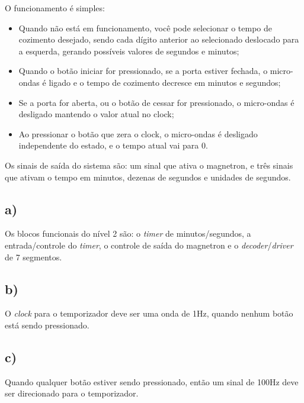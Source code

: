 \documentclass[12pt]{article}
\begin{document}
O funcionamento é simples:

\begin{center}
	\begin{itemize}
		\item Quando não está em funcionamento, você pode selecionar o tempo de cozimento desejado, sendo cada dígito anterior ao selecionado deslocado para a esquerda, gerando possíveis valores de segundos e minutos;
		\item Quando o botão iniciar for pressionado, se a porta estiver fechada, o micro-ondas é ligado e o tempo de cozimento decresce em minutos e segundos;
		\item Se a porta for aberta, ou o botão de cessar for pressionado, o micro-ondas é desligado mantendo o valor atual no clock;
		\item Ao pressionar o botão que zera o clock, o micro-ondas é desligado independente do estado, e o tempo atual vai para 0.
	\end{itemize}
\end{center}

Os sinais de saída do sistema são: um sinal que ativa o magnetron, e três sinais que ativam o tempo em minutos, dezenas de segundos e unidades de segundos.


\subsection*{a)} Os blocos funcionais do nível 2 são: o \textit{timer} de minutos/segundos, a entrada/controle do \textit{timer}, o controle de saída do magnetron e o \textit{decoder}/\textit{driver} de 7 segmentos.

\subsection*{b)} O \textit{clock} para o temporizador deve ser uma onda de 1Hz, quando nenhum botão está sendo pressionado.

\subsection*{c)} Quando qualquer botão estiver sendo pressionado, então um sinal de 100Hz deve ser direcionado para o temporizador.
\end{document}
